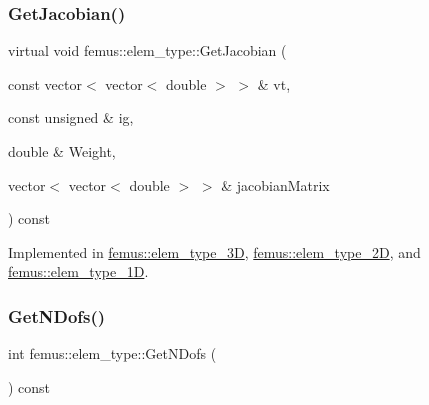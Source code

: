 \mbox{\label{classfemus_1_1elem__type_a6c883b7946e55db8783fd0177546610a}} 
\subsubsection{\texorpdfstring{Get\+Jacobian()}{GetJacobian()}\hspace{0.1cm}{\footnotesize\ttfamily [2/2]}}
{\footnotesize\ttfamily virtual void femus\+::elem\+\_\+type\+::\+Get\+Jacobian (\begin{DoxyParamCaption}\item[{const vector$<$ vector$<$ double $>$ $>$ \&}]{vt,  }\item[{const unsigned \&}]{ig,  }\item[{double \&}]{Weight,  }\item[{vector$<$ vector$<$ double $>$ $>$ \&}]{jacobian\+Matrix }\end{DoxyParamCaption}) const\hspace{0.3cm}{\ttfamily [pure virtual]}}



Implemented in \mbox{\hyperlink{classfemus_1_1elem__type__3_d_aacb6b130a8421fe901505f6d61ad8ddd}{femus\+::elem\+\_\+type\+\_\+3D}}, \mbox{\hyperlink{classfemus_1_1elem__type__2_d_ac1fe4b778f06a58de8ad7057fb982a4b}{femus\+::elem\+\_\+type\+\_\+2D}}, and \mbox{\hyperlink{classfemus_1_1elem__type__1_d_ad39cd6dbe648f384fa1be74d5ceec783}{femus\+::elem\+\_\+type\+\_\+1D}}.

\mbox{\label{classfemus_1_1elem__type_a7597b01400759749a8b76e01722cd89b}} 
\subsubsection{\texorpdfstring{Get\+N\+Dofs()}{GetNDofs()}}
{\footnotesize\ttfamily int femus\+::elem\+\_\+type\+::\+Get\+N\+Dofs (\begin{DoxyParamCaption}{ }\end{DoxyParamCaption}) const\hspace{0.3cm}{\ttfamily [inline]}}

